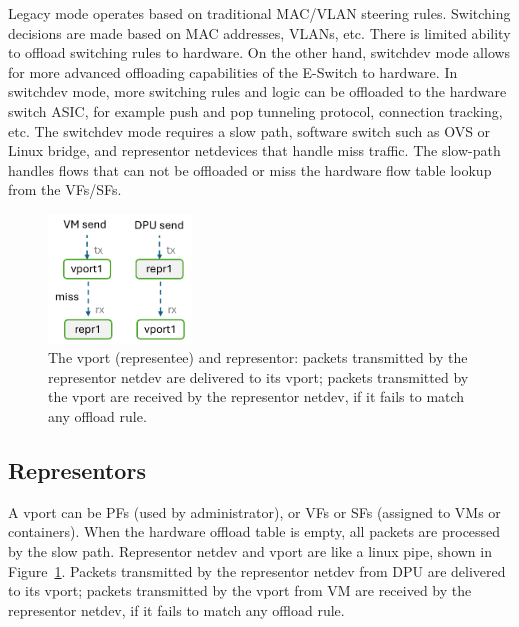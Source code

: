 \documentclass[letterpaper]{article}
\begin{document}
Legacy mode operates based on traditional MAC/VLAN steering rules. Switching
decisions are made based on MAC addresses, VLANs, etc. There is limited ability
to offload switching rules to hardware.
On the other hand, switchdev mode allows for more advanced offloading
capabilities of the E-Switch to hardware. In switchdev mode, more switching
rules and logic can be offloaded to the hardware switch ASIC, for example
push and pop tunneling protocol, connection tracking, etc.
The switchdev mode requires a slow path, software switch such as OVS or
Linux bridge, and representor netdevices that handle miss traffic.
The slow-path handles flows that can not be offloaded or miss the hardware
flow table lookup from the VFs/SFs.
\begin{figure}[h]
\includegraphics[width=1.5in]{pipe.pdf}
\centering
\caption{The vport (representee) and representor: packets transmitted by the representor 
netdev are delivered to its vport; packets transmitted by the vport are
received by the representor netdev, if it fails to match any offload rule.}
\label{fig:pipe}
\end{figure}

\subsection{Representors}
A vport can be PFs (used by administrator), or VFs or SFs (assigned to VMs
or containers). When the hardware offload table is empty, all packets are 
processed by the slow path. Representor netdev and vport are like a linux
pipe, shown in Figure~\ref{fig:pipe}. Packets transmitted by the representor
netdev from DPU are delivered to its vport; packets transmitted by the vport
from VM are received by the representor netdev, if it fails to match any
offload rule.
\end{document}
